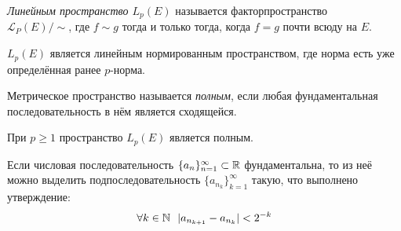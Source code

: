 \begin{definition}
	\textit{Линейным пространство $L_p(E)$} называется факторпространство \\ $\mathcal{L}_P(E) / \sim$, где $f \sim g$ тогда и только тогда, когда $f = g$ почти всюду на $E$.
\end{definition}

\begin{corollary}
	$L_p(E)$ является линейным нормированным пространством, где норма есть уже определённая ранее $p$-норма.
\end{corollary}

\begin{reminder}
	Метрическое пространство называется \textit{полным}, если любая фундаментальная последовательность в нём является сходящейся.
\end{reminder}

\begin{theorem}
	При $p \ge 1$ пространство $L_p(E)$ является полным.
\end{theorem}

\begin{exercise}
	Если числовая последовательность $\{a_n\}_{n = 1}^\infty \subset \mathbb{R}$ фундаментальна, то из неё можно выделить подпоследовательность $\{a_{n_k}\}_{k = 1}^\infty$ такую, что выполнено утверждение:
	\[
		\forall k \in \mathbb{N}\ \ |a_{n_{k + 1}} - a_{n_k}| < 2^{-k}
	\] 
\end{exercise}

